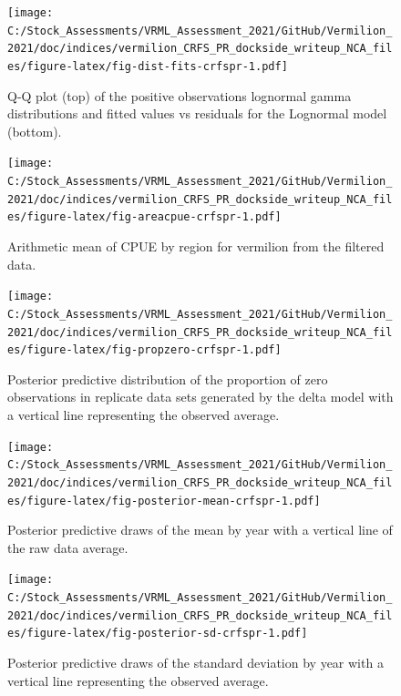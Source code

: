\documentclass[
  english,
  a4paper,
]{article}
\begin{document}
\FloatBarrier

\FloatBarrier

\begin{figure}
\centering
\texttt{[image: C:/Stock\_Assessments/VRML\_Assessment\_2021/GitHub/Vermilion\_2021/doc/indices/vermilion\_CRFS\_PR\_dockside\_writeup\_NCA\_files/figure-latex/fig-dist-fits-crfspr-1.pdf]}
\caption{\label{fig:fig-dist-fits-crfspr}Q-Q plot (top) of the positive observations lognormal gamma distributions and fitted values vs residuals for the Lognormal model (bottom).}
\end{figure}

\begin{figure}
\centering
\texttt{[image: C:/Stock\_Assessments/VRML\_Assessment\_2021/GitHub/Vermilion\_2021/doc/indices/vermilion\_CRFS\_PR\_dockside\_writeup\_NCA\_files/figure-latex/fig-areacpue-crfspr-1.pdf]}
\caption{\label{fig:fig-areacpue-crfspr}Arithmetic mean of CPUE by region for vermilion from the filtered data.}
\end{figure}

\begin{figure}
\centering
\texttt{[image: C:/Stock\_Assessments/VRML\_Assessment\_2021/GitHub/Vermilion\_2021/doc/indices/vermilion\_CRFS\_PR\_dockside\_writeup\_NCA\_files/figure-latex/fig-propzero-crfspr-1.pdf]}
\caption{\label{fig:fig-propzero-crfspr}Posterior predictive distribution of the proportion of zero observations in replicate data sets generated by the delta model with a vertical line representing the observed average.}
\end{figure}

\begin{figure}
\centering
\texttt{[image: C:/Stock\_Assessments/VRML\_Assessment\_2021/GitHub/Vermilion\_2021/doc/indices/vermilion\_CRFS\_PR\_dockside\_writeup\_NCA\_files/figure-latex/fig-posterior-mean-crfspr-1.pdf]}
\caption{\label{fig:fig-posterior-mean-crfspr}Posterior predictive draws of the mean by year with a vertical line of the raw data average.}
\end{figure}

\begin{figure}
\centering
\texttt{[image: C:/Stock\_Assessments/VRML\_Assessment\_2021/GitHub/Vermilion\_2021/doc/indices/vermilion\_CRFS\_PR\_dockside\_writeup\_NCA\_files/figure-latex/fig-posterior-sd-crfspr-1.pdf]}
\caption{\label{fig:fig-posterior-sd-crfspr}Posterior predictive draws of the standard deviation by year with a vertical line representing the observed average.}
\end{figure}
\end{document}
